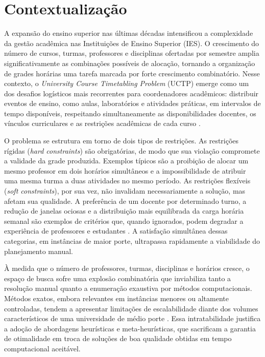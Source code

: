 \section{Contextualização}
\label{sec:1.1}

A expansão do ensino superior nas últimas décadas intensificou a complexidade da gestão acadêmica nas Instituições de Ensino Superior (IES). O crescimento do número de cursos, turmas, professores e disciplinas ofertadas por semestre amplia significativamente as combinações possíveis de alocação, tornando a organização de grades horárias uma tarefa marcada por forte crescimento combinatório. Nesse contexto, o \textit{University Course Timetabling Problem} (UCTP) emerge como um dos desafios logísticos mais recorrentes para coordenadores acadêmicos: distribuir eventos de ensino, como aulas, laboratórios e atividades práticas, em intervalos de tempo disponíveis, respeitando simultaneamente as disponibilidades docentes, os vínculos curriculares e as restrições acadêmicas de cada curso \cite{ceschia2023}.

O problema se estrutura em torno de dois tipos de restrições. As restrições rígidas (\textit{hard constraints}) são obrigatórias, de modo que sua violação compromete a validade da grade produzida. Exemplos típicos são a proibição de alocar um mesmo professor em dois horários simultâneos e a impossibilidade de atribuir uma mesma turma a duas atividades no mesmo período. As restrições flexíveis (\textit{soft constraints}), por sua vez, não invalidam necessariamente a solução, mas afetam sua qualidade. A preferência de um docente por determinado turno, a redução de janelas ociosas e a distribuição mais equilibrada da carga horária semanal são exemplos de critérios que, quando ignorados, podem degradar a experiência de professores e estudantes \cite{weare1995}. A satisfação simultânea dessas categorias, em instâncias de maior porte, ultrapassa rapidamente a viabilidade do planejamento manual.

À medida que o número de professores, turmas, disciplinas e horários cresce, o espaço de busca sofre uma explosão combinatória que inviabiliza tanto a resolução manual quanto a enumeração exaustiva por métodos computacionais. Métodos exatos, embora relevantes em instâncias menores ou altamente controladas, tendem a apresentar limitações de escalabilidade diante dos volumes característicos de uma universidade de médio porte \cite{bashab2023}. Essa intratabilidade justifica a adoção de abordagens heurísticas e meta-heurísticas, que sacrificam a garantia de otimalidade em troca de soluções de boa qualidade obtidas em tempo computacional aceitável.

